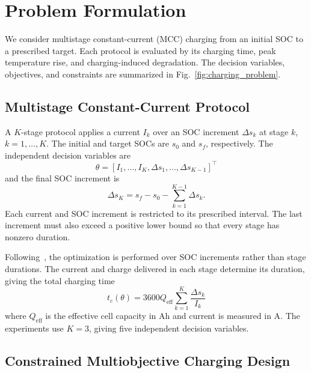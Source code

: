 \section{Problem Formulation}
\label{sec:problem}

We consider multistage constant-current (MCC) charging from an initial SOC to
a prescribed target. Each protocol is evaluated by its charging time, peak
temperature rise, and charging-induced degradation. The decision variables,
objectives, and constraints are summarized in
Fig.~\ref{fig:charging_problem}.



\subsection{Multistage Constant-Current Protocol}

A $K$-stage protocol applies a current $I_k$ over an SOC increment $\Delta s_k$
at stage $k$, $k=1,\ldots,K$. The initial and target SOCs are $s_0$ and $s_f$,
respectively.
The independent decision variables are
\begin{equation}
\theta=[I_1,\ldots,I_K,\Delta s_1,\ldots,\Delta s_{K-1}]^\top
\label{eq:protocol}
\end{equation}
and the final SOC increment is
\begin{equation}
\Delta s_K=s_f-s_0-\sum_{k=1}^{K-1}\Delta s_k.
\label{eq:terminal_soc}
\end{equation}
Each current and SOC increment is restricted to its prescribed interval. The
last increment must also exceed a positive lower bound so that every stage has
nonzero duration.

Following~\cite{nref7,nref8}, the optimization is performed over SOC
increments rather than stage durations. The current and charge delivered in
each stage determine its duration, giving the total charging time
\begin{equation}
t_c(\theta)=3600Q_{\mathrm{eff}}\sum_{k=1}^{K}\frac{\Delta s_k}{I_k}
\label{eq:charging_time}
\end{equation}
where $Q_{\mathrm{eff}}$ is the effective cell capacity in Ah and current is
measured in A. The experiments use $K=3$, giving five independent decision
variables.

\subsection{Constrained Multiobjective Charging Design}

